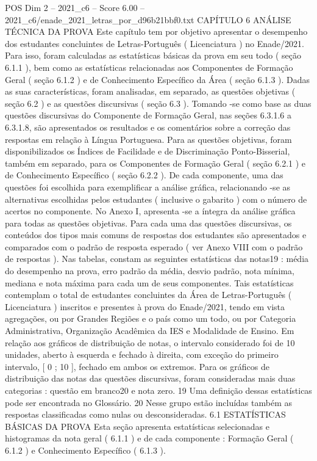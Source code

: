 \begin{textsample}{POS Dim 2 – 2021\_c6 – Score 6.00 – 2021\_c6/enade\_2021\_letras\_por\_d96b21bbf0.txt}  \label{ex:f2_pos_171}
CAPÍTULO 6 ANÁLISE TÉCNICA DA PROVA Este capítulo tem por objetivo apresentar o desempenho dos estudantes concluintes de Letras-Português ( Licenciatura ) no Enade/2021.
Para isso, foram calculadas as estatísticas básicas da prova em seu todo ( seção 6.1.1 ), bem como as estatísticas relacionadas aos Componentes de Formação Geral ( seção 6.1.2 ) e de Conhecimento Específico da Área ( seção 6.1.3 ).
Dadas as suas características, foram analisadas, em separado, as questões objetivas ( seção 6.2 ) e as questões discursivas ( seção 6.3 ).
Tomando -se como base as duas questões discursivas do Componente de Formação Geral, nas seções 6.3.1.6 a 6.3.1.8, são apresentados os resultados e os comentários sobre a correção das respostas em relação à Língua Portuguesa.
Para as questões objetivas, foram disponibilizados os Índices de Facilidade e de Discriminação Ponto-Bisserial, também em separado, para os Componentes de Formação Geral ( seção 6.2.1 ) e de Conhecimento Específico ( seção 6.2.2 ).
De cada componente, uma das questões foi escolhida para exemplificar a análise gráfica, relacionando -se as alternativas escolhidas pelos estudantes ( inclusive o gabarito ) com o número de acertos no componente.
No Anexo I, apresenta -se a íntegra da análise gráfica para todas as questões objetivas.
Para cada uma das questões discursivas, os conteúdos dos tipos mais comuns de respostas dos estudantes são apresentados e comparados com o padrão de resposta esperado ( ver Anexo VIII com o padrão de respostas ).
Nas tabelas, constam as seguintes estatísticas das notas19 : média do desempenho na prova, erro padrão da média, desvio padrão, nota mínima, mediana e nota máxima para cada um de seus componentes.
Tais estatísticas contemplam o total de estudantes concluintes da Área de Letras-Português ( Licenciatura ) inscritos e presentes à prova do Enade/2021, tendo em vista agregações, ou por Grandes Regiões e o país como um todo, ou por Categoria Administrativa, Organização Acadêmica da IES e Modalidade de Ensino.
Em relação aos gráficos de distribuição de notas, o intervalo considerado foi de 10 unidades, aberto à esquerda e fechado à direita, com exceção do primeiro intervalo, [ 0 ; 10 ], fechado em ambos os extremos.
Para os gráficos de distribuição das notas das questões discursivas, foram consideradas mais duas categorias : questão em branco20 e nota zero. 19 Uma definição dessas estatísticas pode ser encontrada no Glossário. 20 Nesse grupo estão incluídas também as respostas classificadas como nulas ou desconsideradas. 6.1 ESTATÍSTICAS BÁSICAS DA PROVA Esta seção apresenta estatísticas selecionadas e histogramas da nota geral ( 6.1.1 ) e de cada componente : Formação Geral ( 6.1.2 ) e Conhecimento Específico ( 6.1.3 ).

\end{textsample}
